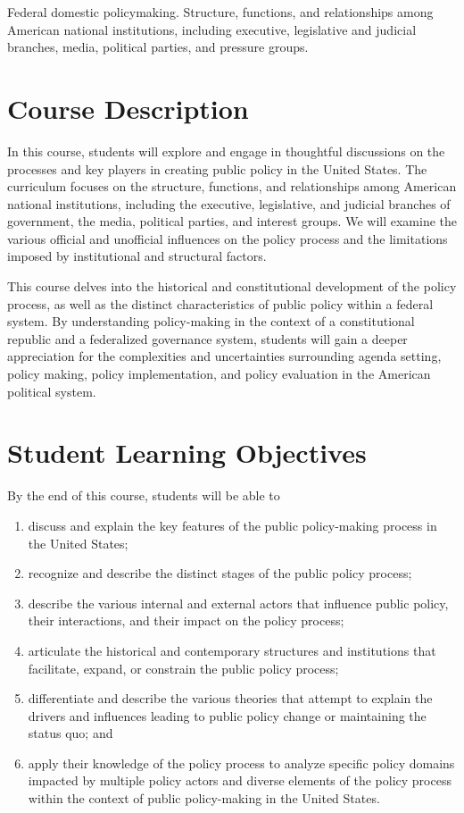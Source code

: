 \documentclass[12pt, letterpaper]{article}
\begin{document}
	Federal domestic policymaking. Structure, functions, and relationships among American national institutions, including executive, legislative and judicial branches, media, political parties, and pressure groups.

\section{Course Description}

	In this course, students will explore and engage in thoughtful discussions on the processes and key players in creating public policy in the United States. The curriculum focuses on the structure, functions, and relationships among American national institutions, including the executive, legislative, and judicial branches of government, the media, political parties, and interest groups. We will examine the various official and unofficial influences on the policy process and the limitations imposed by institutional and structural factors.

    \vspace{1ex}

	\noindent This course delves into the historical and constitutional development of the policy process, as well as the distinct characteristics of public policy within a federal system. By understanding policy-making in the context of a constitutional republic and a federalized governance system, students will gain a deeper appreciation for the complexities and uncertainties surrounding agenda setting, policy making, policy implementation, and policy evaluation in the American political system.

\section{Student Learning Objectives}

By the end of this course, students will be able to

\begin{enumerate}
	\item discuss and explain the key features of the public policy-making process in the United States;
	\item recognize and describe the distinct stages of the public policy process;
	\item describe the various internal and external actors that influence public policy, their interactions, and their impact on the policy process;
	\item articulate the historical and contemporary structures and institutions that facilitate, expand, or constrain the public policy process;
	\item differentiate and describe the various theories that attempt to explain the drivers and influences leading to public policy change or maintaining the status quo; and
	\item apply their knowledge of the policy process to analyze specific policy domains impacted by multiple policy actors and diverse elements of the policy process within the context of public policy-making in the United States.
\end{enumerate}
\end{document}
